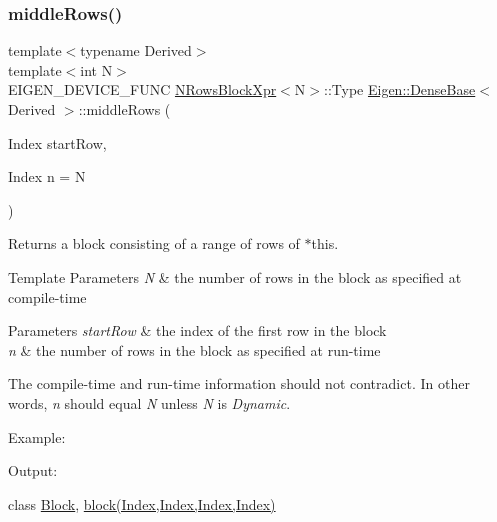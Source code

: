 \subsubsection{\texorpdfstring{middleRows()}{middleRows()}\hspace{0.1cm}{\footnotesize\ttfamily [2/2]}}
{\footnotesize\ttfamily template$<$typename Derived$>$ \\
template$<$int N$>$ \\
E\+I\+G\+E\+N\+\_\+\+D\+E\+V\+I\+C\+E\+\_\+\+F\+U\+NC \mbox{\hyperlink{struct_eigen_1_1_dense_base_1_1_n_rows_block_xpr}{N\+Rows\+Block\+Xpr}}$<$N$>$\+::Type \mbox{\hyperlink{class_eigen_1_1_dense_base}{Eigen\+::\+Dense\+Base}}$<$ Derived $>$\+::middle\+Rows (\begin{DoxyParamCaption}\item[{Index}]{start\+Row,  }\item[{Index}]{n = {\ttfamily N} }\end{DoxyParamCaption})\hspace{0.3cm}{\ttfamily [inline]}}

\begin{DoxyReturn}{Returns}
a block consisting of a range of rows of $\ast$this.
\end{DoxyReturn}

\begin{DoxyTemplParams}{Template Parameters}
{\em N} & the number of rows in the block as specified at compile-\/time \\
\hline
\end{DoxyTemplParams}

\begin{DoxyParams}{Parameters}
{\em start\+Row} & the index of the first row in the block \\
\hline
{\em n} & the number of rows in the block as specified at run-\/time\\
\hline
\end{DoxyParams}
The compile-\/time and run-\/time information should not contradict. In other words, {\itshape n} should equal {\itshape N} unless {\itshape N} is {\itshape Dynamic}.

Example\+: 
\begin{DoxyCodeInclude}{0}
\end{DoxyCodeInclude}
 Output\+: 
\begin{DoxyVerbInclude}
\end{DoxyVerbInclude}
 class \mbox{\hyperlink{class_eigen_1_1_block}{Block}}, \mbox{\hyperlink{class_eigen_1_1_dense_base_ab8e42e67c5cfd5fa13e684642f0f65bf}{block(\+Index,\+Index,\+Index,\+Index)}} \mbox{\label{class_eigen_1_1_dense_base_a6634944be3d4fef551b57ffad30467f2}} 
